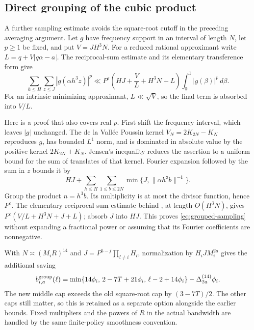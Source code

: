 \documentclass[11pt,letterpaper]{article}
\theoremstyle{remark}
\newcommand{\eps}{\varepsilon}
\begin{document}
\subsection{Direct grouping of the cubic product}

A further sampling estimate avoids the square-root cutoff in the preceding
averaging argument. Let $g$ have frequency support in an interval of length $N$,
let $p\ge1$ be fixed, and put $V=JH^3N$. For a reduced rational approximant write
$L=q+V|q\alpha-a|$. The reciprocal-sum estimate and its elementary transference
form give
\begin{equation}\label{eq:grouped-sampling}
 \sum_{h\le H}\sum_{z\le J}|g(\alpha h^3z)|^p
 \ll P^\eps\left(HJ+\frac{V}{L}+H^3N+L\right)
                      \int_0^1|g(\beta)|^p\,d\beta.
\end{equation}
For an intrinsic minimizing approximant, $L\ll\sqrt V$, so the final term is
absorbed into $V/L$.

Here is a proof that also covers real $p$. First shift the frequency interval,
which leaves $|g|$ unchanged. The de la Vall\'ee Poussin kernel
$V_N=2K_{2N}-K_N$ reproduces $g$, has bounded $L^1$ norm, and is dominated in
absolute value by the positive kernel $2K_{2N}+K_N$. Jensen's inequality reduces
the assertion to a uniform bound for the sum of translates of that kernel.
Fourier expansion followed by the sum in $z$ bounds it by
\[
 HJ+\sum_{h\le H}\sum_{1\le b\le2N}
                   \min\{J,\|\alpha h^3b\|^{-1}\}.
\]
Group the product $n=h^3b$. Its multiplicity is at most the divisor function,
hence $P^\eps$. The elementary reciprocal-sum estimate behind
\cite[Lemma~4.4]{VW95}, at length $O(H^3N)$, gives
$P^\eps(V/L+H^3N+J+L)$; absorb $J$ into $HJ$.
This proves \eqref{eq:grouped-sampling} without expanding a fractional power
or assuming that its Fourier coefficients are nonnegative.

With $N\asymp(M_iR)^{14}$ and
$J=P^{5-j}\prod_{l\ne i}H_l$, normalization by $H_iJM_i^{2a}$ gives
the additional saving
\begin{equation}\label{eq:grouped}
 b_{i,a}^{\rm group}(\ell)
 =\min\{14\phi_i,\,2-7T+21\phi_i,\,\ell-2+14\phi_i\}
                         -\Delta_{2a}^{(14)}\phi_i.
\end{equation}
The new middle cap exceeds the old square-root cap by $(3-7T)/2$.
The other caps still matter, so this is retained as a separate option alongside
the earlier bounds. Fixed multipliers and the powers of $R$ in the actual
bandwidth are handled by the same finite-policy smoothness convention.
\end{document}
